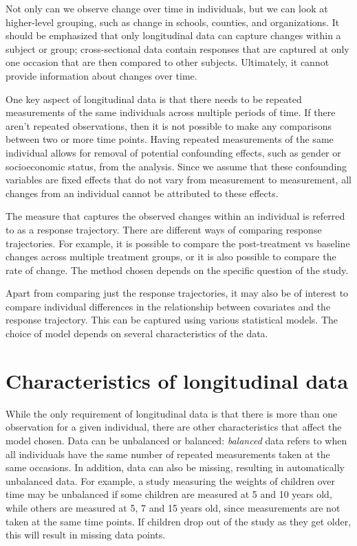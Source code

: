 \documentclass[12pt, twoside]{amherstthesis}
\begin{document}
Not only can we observe change over time in individuals, but we can look at higher-level grouping, such as change in schools, counties, and organizations. It should be emphasized that only longitudinal data can capture changes within a subject or group; cross-sectional data contain responses that are captured at only one occasion that are then compared to other subjects. Ultimately, it cannot provide information about changes over time.

One key aspect of longitudinal data is that there needs to be repeated measurements of the same individuals across multiple periods of time. If there aren't repeated observations, then it is not possible to make any comparisons between two or more time points. Having repeated measurements of the same individual allows for removal of potential confounding effects, such as gender or socioeconomic status, from the analysis. Since we assume that these confounding variables are fixed effects that do not vary from measurement to measurement, all changes from an individual cannot be attributed to these effects.

The measure that captures the observed changes within an individual is referred to as a response trajectory. There are different ways of comparing response trajectories. For example, it is possible to compare the post-treatment vs baseline changes across multiple treatment groups, or it is also possible to compare the rate of change. The method chosen depends on the specific question of the study.

Apart from comparing just the response trajectories, it may also be of interest to compare individual differences in the relationship between covariates and the response trajectory. This can be captured using various statistical models. The choice of model depends on several characteristics of the data.

\hypertarget{characteristics-of-longitudinal-data}{%
\section{Characteristics of longitudinal data}\label{characteristics-of-longitudinal-data}}

While the only requirement of longitudinal data is that there is more than one observation for a given individual, there are other characteristics that affect the model chosen. Data can be unbalanced or balanced: \emph{balanced} data refers to when all individuals have the same number of repeated measurements taken at the same occasions. In addition, data can also be missing, resulting in automatically unbalanced data. For example, a study measuring the weights of children over time may be unbalanced if some children are measured at 5 and 10 years old, while others are measured at 5, 7 and 15 years old, since measurements are not taken at the same time points. If children drop out of the study as they get older, this will result in missing data points.
\end{document}
